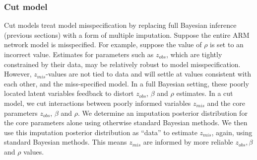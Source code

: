 \documentclass{article}
\begin{document}
%
%





\subsubsection{Cut model} \label{sec:cm}
Cut models treat model misspecification by replacing full Bayesian inference (previous sections) with a form of multiple imputation.
Suppose the entire ARM network model is misspecified. For example, suppose the value of $\rho$ is set to an incorrect value.
Estimates for parameters such as
$z_{obs}$, which are tightly constrained by their data, may be relatively robust to model misspecification.
However, $z_{mis}$-values are not tied to data and will settle at values consistent with each other, and the miss-specified model.
In a full Bayesian setting, these poorly located latent variables feedback to distort $z_{obs}$, $\beta$ and $\rho$ estimates.
In a cut model, we cut interactions between poorly informed variables $z_{mis}$ and the core parameters $z_{obs}$, $\beta$ and $\rho$.
We determine an imputation posterior distribution for the core parameters alone using otherwise standard Bayesian methods.
We then use this imputation posterior distribution as ``data'' to estimate $z_{mis}$, again, using standard Bayesian methods.
This means $z_{mis}$ are informed by more reliable $z_{obs}, \beta$ and $\rho$ values.
\end{document}
